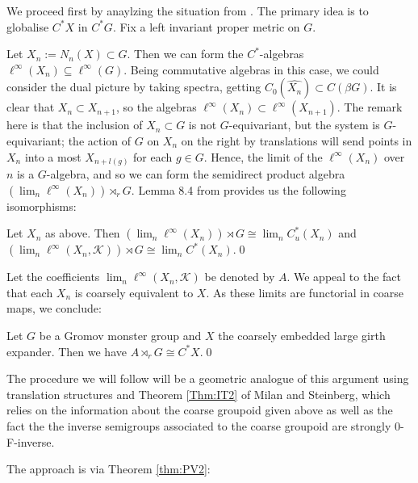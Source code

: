 We proceed first by anaylzing the situation from \cite[Section 8]{explg1}. The primary idea is to globalise  $C^{*}X$ in $C^{*}G$. Fix a left invariant proper metric on $G$.

Let $X_{n}:=N_{n}(X)\subset G$. Then we can form the $C^{*}$-algebras $\ell^{\infty}(X_{n}) \subseteq \ell^{\infty}(G)$. Being commutative algebras in this case, we could consider the dual picture by taking spectra, getting $C_{0}(\widehat{X_{n}}) \subset C(\beta G)$. It is clear that $X_{n} \subset X_{n+1}$, so the algebras $\ell^{\infty}(X_{n}) \subset \ell^{\infty}(X_{n+1})$. The remark here is that the inclusion of $X_{n} \subset G$ is not $G$-equivariant, but the system is $G$-equivariant; the action of $G$ on $X_{n}$ on the right by translations will send points in $X_{n}$ into a most $X_{n+l(g)}$ for each $g \in G$. Hence, the limit of the $\ell^{\infty}(X_{n})$ over $n$ is a $G$-algebra, and so we can form the semidirect product algebra $(\lim_{n}\ell^{\infty}(X_{n}))\rtimes_{r} G$. Lemma 8.4 from \cite{explg1} provides us the following isomorphisms:

\begin{lemma}\label{lem:GMG}
Let $X_{n}$ as above. Then $(\lim_{n}\ell^{\infty}(X_{n}))\rtimes G \cong \lim_{n} C^{*}_{u}(X_{n})$ and $(\lim_{n}\ell^{\infty}(X_{n},\mathcal{K}))\rtimes G \cong \lim_{n} C^{*}(X_{n})$.\qed
\end{lemma}

Let the coefficients $\lim_{n}\ell^{\infty}(X_{n},\mathcal{K})$ be denoted by $A$. We appeal to the fact that each $X_{n}$ is coarsely equivalent to $X$. As these limits are functorial in coarse maps, we conclude:

\begin{proposition}
Let $G$ be a Gromov monster group and $X$ the coarsely embedded large girth expander. Then we have $A\rtimes_{r} G \cong C^{*}X$.\qed
\end{proposition}

The procedure we will follow will be a geometric analogue of this argument using translation structures and Theorem \ref{Thm:IT2} of Milan and Steinberg, which relies on the information about the coarse groupoid given above as well as the fact the the inverse semigroups associated to the coarse groupoid are strongly 0-F-inverse.

The approach is via Theorem \ref{thm:PV2}:

